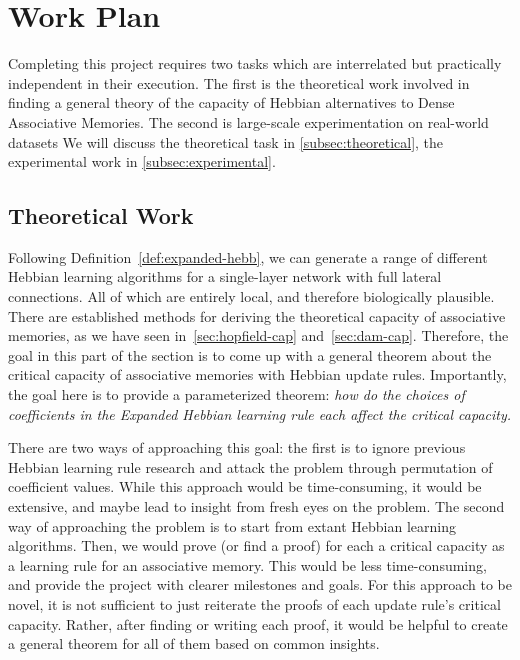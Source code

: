 \documentclass{article}
\theoremstyle{definition}
\begin{document}
\section{Work Plan}

Completing this project requires two tasks which are interrelated but
practically independent in their execution. The first is the theoretical
work involved in finding a general theory of the capacity of Hebbian
alternatives
to Dense Associative Memories. The second is large-scale experimentation
on real-world datasets We will discuss the theoretical task in
\autoref{subsec:theoretical},
the experimental work in \autoref{subsec:experimental}.

\subsection{Theoretical Work}\label{subsec:theoretical}

Following Definition~\ref{def:expanded-hebb}, we can generate a range of
different Hebbian learning algorithms for a single-layer
network with full lateral connections. All of which are entirely local,
and therefore biologically plausible. There are established methods for
deriving the theoretical capacity of associative memories, as we have
seen in~\autoref{sec:hopfield-cap} and~\autoref{sec:dam-cap}. Therefore,
the goal in this part of the section is to come up with a general theorem
about the critical capacity of associative memories with Hebbian update
rules.
Importantly, the goal here is to provide a parameterized theorem: \textit{how
  do the choices of coefficients in the Expanded Hebbian learning rule
each affect the critical capacity.}

There are two ways of approaching this goal: the first is to ignore
previous Hebbian learning rule research and attack the problem through
permutation of coefficient values. While this approach would be time-consuming,
it would be extensive, and maybe lead to insight from fresh eyes on the problem.
The second way of approaching the problem is to start from extant Hebbian
learning algorithms. Then, we would prove (or find a proof)
for each a critical capacity as a learning rule for an associative memory. This
would be less time-consuming, and provide the project with clearer milestones
and goals. For this approach to be novel, it is not sufficient to just
reiterate the proofs of each update rule's critical capacity. Rather,
after finding or writing each proof, it would be helpful to create a general
theorem for all of them based on common insights.
\end{document}
